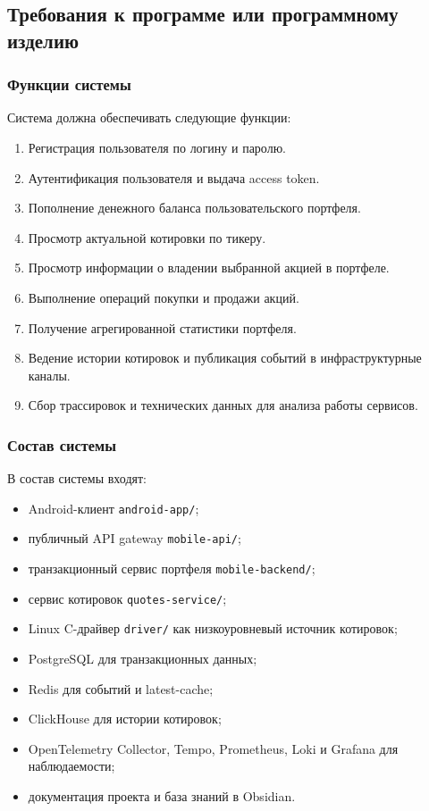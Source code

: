 \documentclass[12pt,a4paper]{article}
\begin{document}
\subsection{Требования к программе или программному изделию}

\subsubsection{Функции системы}

Система должна обеспечивать следующие функции:

\begin{enumerate}[leftmargin=1.2cm]
    \item Регистрация пользователя по логину и паролю.
    \item Аутентификация пользователя и выдача access token.
    \item Пополнение денежного баланса пользовательского портфеля.
    \item Просмотр актуальной котировки по тикеру.
    \item Просмотр информации о владении выбранной акцией в портфеле.
    \item Выполнение операций покупки и продажи акций.
    \item Получение агрегированной статистики портфеля.
    \item Ведение истории котировок и публикация событий в инфраструктурные каналы.
    \item Сбор трассировок и технических данных для анализа работы сервисов.
\end{enumerate}

\subsubsection{Состав системы}

В состав системы входят:

\begin{itemize}[leftmargin=1.2cm]
    \item Android-клиент \texttt{android-app/};
    \item публичный API gateway \texttt{mobile-api/};
    \item транзакционный сервис портфеля \texttt{mobile-backend/};
    \item сервис котировок \texttt{quotes-service/};
    \item Linux C-драйвер \texttt{driver/} как низкоуровневый источник котировок;
    \item PostgreSQL для транзакционных данных;
    \item Redis для событий и latest-cache;
    \item ClickHouse для истории котировок;
    \item OpenTelemetry Collector, Tempo, Prometheus, Loki и Grafana для наблюдаемости;
    \item документация проекта и база знаний в Obsidian.
\end{itemize}
\end{document}
